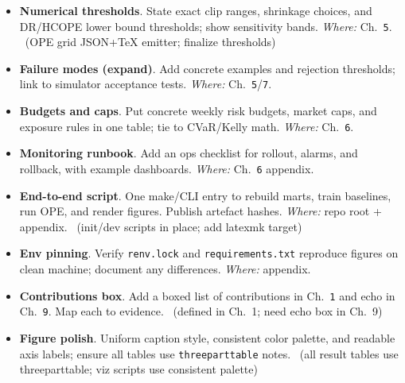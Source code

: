 \begin{itemize}
  \item {} \textbf{Numerical thresholds}. State exact clip ranges, shrinkage choices, and DR/HCOPE lower bound thresholds; show sensitivity bands. \emph{Where:} Ch.~\texttt{5}. \done\ (OPE grid JSON+TeX emitter; finalize thresholds)
  \item {} \textbf{Failure modes (expand)}. Add concrete examples and rejection thresholds; link to simulator acceptance tests. \emph{Where:} Ch.~\texttt{5}/\texttt{7}.
\end{itemize}

\begin{itemize}
  \item {} \textbf{Budgets and caps}. Put concrete weekly risk budgets, market caps, and exposure rules in one table; tie to CVaR/Kelly math. \emph{Where:} Ch.~\texttt{6}.
  \item {} \textbf{Monitoring runbook}. Add an ops checklist for rollout, alarms, and rollback, with example dashboards. \emph{Where:} Ch.~\texttt{6} appendix.
\end{itemize}

\begin{itemize}
  \item {} \textbf{End-to-end script}. One make/CLI entry to rebuild marts, train baselines, run OPE, and render figures. Publish artefact hashes. \emph{Where:} repo root + appendix. \wip\ (init/dev scripts in place; add latexmk target)
  \item {} \textbf{Env pinning}. Verify \texttt{renv.lock} and \texttt{requirements.txt} reproduce figures on clean machine; document any differences. \emph{Where:} appendix. \wip
\end{itemize}

\begin{itemize}
  \item {} \textbf{Contributions box}. Add a boxed list of contributions in Ch.~\texttt{1} and echo in Ch.~\texttt{9}. Map each to evidence. \wip\ (defined in Ch.~1; need echo box in Ch.~9)
  \item {} \textbf{Figure polish}. Uniform caption style, consistent color palette, and readable axis labels; ensure all tables use \texttt{threeparttable} notes. \done\ (all result tables use threeparttable; viz scripts use consistent palette)
\end{itemize}

